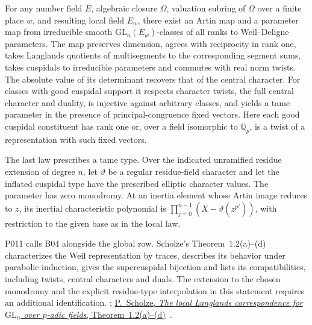\begin{formalstatement}\label{sub:B04}
For any number field $E$, algebraic closure $\Omega$, valuation subring
of $\Omega$ over a finite place $w$, and resulting local field $E_w$,
there exist an Artin map and a parameter map from irreducible smooth
$\mathrm{GL}_n(E_w)$-classes of all ranks to Weil--Deligne parameters.
The map preserves dimension, agrees with reciprocity in rank one,
takes Langlands quotients of multisegments to the corresponding segment
sums, takes cuspidals to irreducible parameters and commutes with real
norm twists. The absolute value of its determinant recovers that of the
central character. For classes with good cuspidal support it respects
character twists, the full central character and duality, is injective
against arbitrary classes, and yields a tame parameter in the presence
of principal-congruence fixed vectors. Here each good cuspidal constituent
has rank one or, over a field isomorphic to $\mathbb Q_p$, is a twist of
a representation with such fixed vectors.

The last law prescribes a tame type. Over the indicated unramified residue
extension of degree $n$, let $\vartheta$ be a regular residue-field character
and let the inflated cuspidal type have the prescribed elliptic character
values. The parameter has zero monodromy. At an inertia element whose Artin
image reduces to $z$, its inertial characteristic polynomial is
$\prod_{j=0}^{n-1}(X-\vartheta(z^{p^j}))$, with restriction to the given
base as in the local law.
\end{formalstatement}
P011 calls B04 alongside the global row. Scholze's Theorem~1.2(a)--(d) characterizes the Weil representation by traces, describes its behavior under parabolic induction, gives the supercuspidal bijection and lists its compatibilities, including twists, central characters and duals. The extension to the chosen monodromy and the explicit
residue-type interpolation in this statement requires an additional
identification. ;
\href{https://people.mpim-bonn.mpg.de/scholze/LocalLanglands.pdf}{P.~Scholze, \emph{The local Langlands correspondence for $\mathrm{GL}_n$ over $p$-adic fields}, Theorem~1.2(a)--(d)}~\cite{r21-scholze}.
